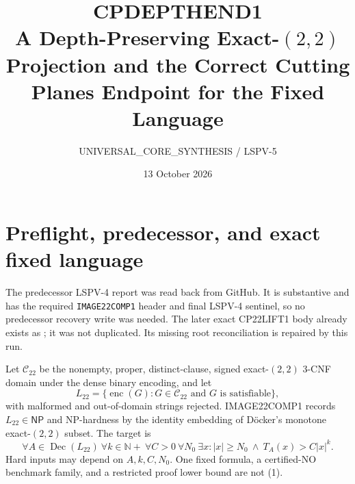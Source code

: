 \documentclass[11pt]{article}
\title{CPDEPTHEND1\\\large A Depth-Preserving Exact-$(2,2)$ Projection and the Correct Cutting Planes Endpoint for the Fixed Language}
\author{UNIVERSAL\_CORE\_SYNTHESIS / LSPV-5}
\date{13 October 2026}
\newcommand{\Ltwo}{L_{22}}
\begin{document}
\maketitle

\begin{center}
\end{center}

\section{Preflight, predecessor, and exact fixed language}

The predecessor LSPV-4 report
was read back from GitHub.  It is substantive and has the required
\texttt{IMAGE22COMP1} header and final LSPV-4 sentinel, so no predecessor
recovery write was needed.  The later exact CP22LIFT1 body already exists as
; it was not
duplicated.  Its missing root reconciliation is repaired by this run.

Let \(\mathcal C_{22}\) be the nonempty, proper, distinct-clause, signed
exact-$(2,2)$ 3-CNF domain under the dense binary encoding, and let
\[
 \Ltwo=\{\operatorname{enc}(G):G\in\mathcal C_{22}
          \text{ and }G\text{ is satisfiable}\},
\]
with malformed and out-of-domain strings rejected.  IMAGE22COMP1 records
\(\Ltwo\in\mathsf{NP}\) and NP-hardness by the identity embedding of
D\"ocker's monotone exact-$(2,2)$ subset.  The target is
\[
 \forall A\in\operatorname{Dec}(\Ltwo)\ \forall k\in\mathbb N+ \ \forall C>0\ \forall N_0\ \exists x:
 |x|\ge N_0\ \wedge\ T_A(x)>C|x|^k.                 \tag{1}
\]
Hard inputs may depend on \(A,k,C,N_0\).  One fixed formula, a certified-NO
benchmark family, and a restricted proof lower bound are not (1).
\end{document}
